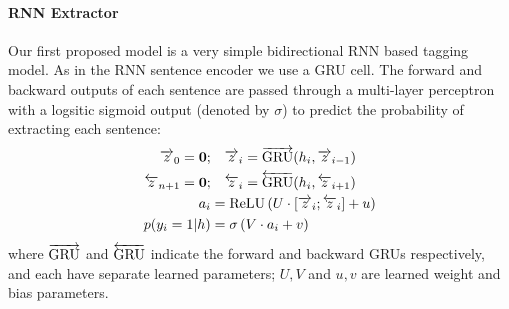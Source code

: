 \paragraph{RNN Extractor}{
    Our first proposed model is a very simple bidirectional
RNN based tagging model. As in the RNN sentence encoder we use a GRU cell.
The  forward and backward outputs of each sentence are passed through a 
multi-layer perceptron with a logsitic sigmoid output (denoted by $\sigma$)
to predict the probability
of extracting each sentence:
\begin{align}
    \rExtHidden_0 = \mathbf{0};&\quad   \rExtHidden_i = \rgru(\sentEmb[i], \rExtHidden_{i-1}) \\
    \lExtHidden_{\docSize + 1} = \mathbf{0};&\quad    \lExtHidden_i = \lgru(\sentEmb[i], \lExtHidden_{i+1}) \\
   \logits_i &= \relu\left(U \cdot [\rExtHidden_i; \lExtHidden_i] + u \right)\\
   p(\slabel_i=1|\sentvec) &= \sigma\left(V\cdot \logits_i + v  \right)
\end{align}
where $\overrightarrow{\operatorname{GRU}}$ and $\overleftarrow{\operatorname{GRU}}$ indicate the 
forward and backward GRUs respectively, and each have separate learned 
parameters; $U, V$ and $u, v$ are learned weight and bias parameters.

}
